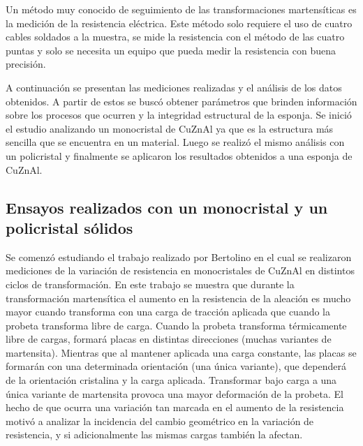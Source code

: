 \documentclass[a4paper,12pt,fleqn,twoside,openany]{book}
\begin{document}
 Un método muy conocido de seguimiento de las transformaciones martensíticas es la medición de la resistencia eléctrica. Este método solo requiere el uso de cuatro cables soldados a la muestra, se mide la resistencia con el método de las cuatro puntas y solo se necesita un equipo que pueda medir la resistencia con buena precisión. 

A continuación se presentan las mediciones realizadas y el análisis de los datos obtenidos. A partir de estos se buscó obtener parámetros que brinden información sobre los procesos que ocurren y la integridad estructural de la esponja. Se inició el estudio analizando un monocristal de CuZnAl ya que es la estructura más sencilla que se encuentra en un material. Luego se realizó el mismo análisis con un policristal y finalmente se aplicaron los resultados obtenidos a una esponja de CuZnAl.




\subsection{Ensayos realizados con un monocristal y un policristal sólidos} \label{PoilicMonocrist}




 
Se comenzó estudiando el trabajo realizado por Bertolino \cite{resistencia} en el cual se realizaron mediciones de la variación de resistencia en monocristales de CuZnAl en distintos ciclos de transformación. En este trabajo se muestra que durante la transformación martensítica el aumento en la resistencia de la aleación es mucho mayor  cuando transforma con una carga de tracción aplicada que cuando la probeta transforma libre de carga. Cuando la probeta transforma térmicamente libre de cargas, formará placas en distintas direcciones (muchas variantes de martensita). Mientras que al mantener aplicada una carga constante, las placas se formarán con una determinada orientación (una única variante), que dependerá de la orientación cristalina y la carga aplicada. Transformar bajo carga a una única variante de martensita provoca una mayor deformación de la probeta. El hecho de que ocurra una variación tan marcada en el aumento de la resistencia motivó a analizar la incidencia del cambio geométrico en la variación de resistencia, y si adicionalmente las mismas cargas también la afectan. 
\end{document}
